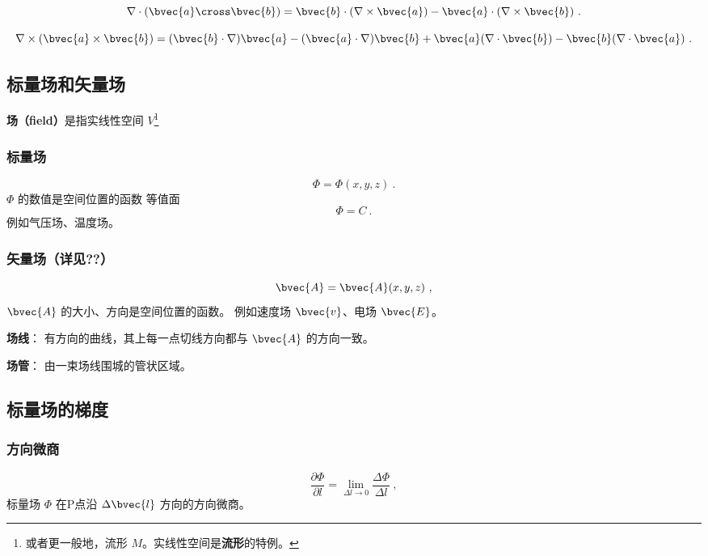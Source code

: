 \begin{equation}
\nabla\cdot(\bvec{a}\cross\bvec{b})=\bvec{b}\cdot(\nabla\times\bvec{a})-\bvec{a}\cdot(\nabla\times\bvec{b})~.
\end{equation}

\begin{equation}
\nabla\times(\bvec{a}\times\bvec{b})=(\bvec{b}\cdot\nabla)\bvec{a}-(\bvec{a}\cdot\nabla)\bvec{b}+\bvec{a}(\nabla\cdot\bvec{b})-\bvec{b}(\nabla\cdot\bvec{a})~.
\end{equation}



\subsection{标量场和矢量场}

\textbf{场（field）}是指实线性空间 $V$\footnote{或者更一般地，流形 $M$。实线性空间是\textbf{流形}的特例。}

\subsubsection{标量场}
\begin{equation}\label{eq_VecAnl_1}
\Phi=\Phi(x,y,z)~.
\end{equation}
 $\Phi$ 的数值是空间位置的函数
 等值面
\begin{equation}\label{eq_VecAnl_2}
\Phi=C~.
\end{equation}
 例如气压场、温度场。
\subsubsection{矢量场（详见??）}%
\begin{equation}\label{eq_VecAnl_3}
\bvec {A}= \bvec{A}(x,y,z)~,
\end{equation}
$\bvec{A}$ 的大小、方向是空间位置的函数。
例如速度场 $\bvec{v}$、电场 $\bvec{E}$。

\textbf{场线}： 有方向的曲线，其上每一点切线方向都与 $\bvec{A}$ 的方向一致。

\textbf{场管}： 由一束场线围城的管状区域。

\subsection{标量场的梯度}%
\subsubsection{方向微商}
\begin{equation}\label{eq_VecAnl_4}
\frac{\partial \Phi}{\partial l}=\lim_{\Delta l \to 0}\frac{\Delta \Phi}{\Delta l}~,
\end{equation}
标量场 $\Phi$ 在P点沿 $\Delta \bvec{l} $ 方向的方向微商。

